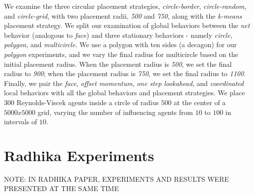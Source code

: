 We examine the three circular placement strategies, \textit{circle-border},
\textit{circle-random}, and \textit{circle-grid}, with two placement radii,
\textit{500} and \textit{750}, along with the \textit{k-means} placement
strategy.
We split our examination of global behaviors between the \textit{net} behavior
(analogous to \textit{face}) and three stationary behaviors - namely
\textit{circle}, \textit{polygon}, and \textit{multicircle}.
We use a polygon with ten sides (a decagon) for our \textit{polygon} experiments,
and we vary the final radius for multicircle based on the initial placement
radius.
When the placement radius is \textit{500}, we set the final radius to
\textit{900}; when the placement radius is \textit{750}, we set the final radius
to \textit{1100}.
Finally, we pair the \textit{face}, \textit{offset momentum}, \textit{one step
lookahead}, and \textit{coordinated} local behaviors with all the global behaviors
and placement strategies.
We place $300$ Reynolds-Viscek agents inside a circle of radius $500$ at the center
of a $5000x5000$ grid, varying the number of influencing agents from $10$ to $100$
in intervals of $10$.

\section{Radhika Experiments}

NOTE: IN RADHIKA PAPER, EXPERIMENTS AND RESULTS WERE PRESENTED AT THE SAME TIME

